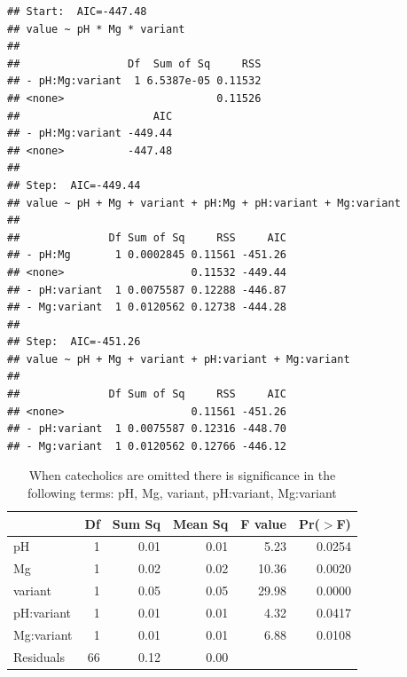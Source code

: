 \documentclass[]{tufte-handout}
\begin{document}
\begin{verbatim}
## Start:  AIC=-447.48
## value ~ pH * Mg * variant
## 
##                 Df  Sum of Sq     RSS
## - pH:Mg:variant  1 6.5387e-05 0.11532
## <none>                        0.11526
##                     AIC
## - pH:Mg:variant -449.44
## <none>          -447.48
## 
## Step:  AIC=-449.44
## value ~ pH + Mg + variant + pH:Mg + pH:variant + Mg:variant
## 
##              Df Sum of Sq     RSS     AIC
## - pH:Mg       1 0.0002845 0.11561 -451.26
## <none>                    0.11532 -449.44
## - pH:variant  1 0.0075587 0.12288 -446.87
## - Mg:variant  1 0.0120562 0.12738 -444.28
## 
## Step:  AIC=-451.26
## value ~ pH + Mg + variant + pH:variant + Mg:variant
## 
##              Df Sum of Sq     RSS     AIC
## <none>                    0.11561 -451.26
## - pH:variant  1 0.0075587 0.12316 -448.70
## - Mg:variant  1 0.0120562 0.12766 -446.12
\end{verbatim}

\begin{table}[ht]
\centering
\begin{tabular}{lrrrrr}
  \toprule
 & Df & Sum Sq & Mean Sq & F value & Pr($>$F) \\ 
  \midrule
pH          & 1 & 0.01 & 0.01 & 5.23 & 0.0254 \\ 
  Mg          & 1 & 0.02 & 0.02 & 10.36 & 0.0020 \\ 
  variant     & 1 & 0.05 & 0.05 & 29.98 & 0.0000 \\ 
  pH:variant  & 1 & 0.01 & 0.01 & 4.32 & 0.0417 \\ 
  Mg:variant  & 1 & 0.01 & 0.01 & 6.88 & 0.0108 \\ 
  Residuals   & 66 & 0.12 & 0.00 &  &  \\ 
   \bottomrule
\end{tabular}
\caption{When catecholics are omitted there is significance in the following terms: pH, Mg, variant, pH:variant, Mg:variant} 
\end{table}

\end{document}
